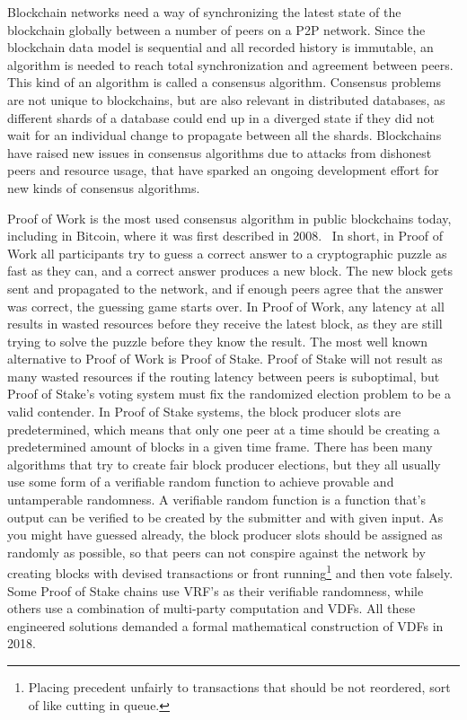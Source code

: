 Blockchain networks need a way of synchronizing the latest state of the blockchain globally between a number of peers on a P2P network. Since the blockchain data model is sequential and all recorded history is immutable, an algorithm is needed to reach total synchronization and agreement between peers. This kind of an algorithm is called a consensus algorithm. Consensus problems are not unique to blockchains, but are also relevant in distributed databases, as different shards of a database could end up in a diverged state if they did not wait for an individual change to propagate between all the shards. Blockchains have raised new issues in consensus algorithms due to attacks from dishonest peers and resource usage, that have sparked an ongoing development effort for new kinds of consensus algorithms.

Proof of Work is the most used consensus algorithm in public blockchains today, including in Bitcoin, where it was first described in 2008.~\cite{Nakamoto2019-ax} In short, in Proof of Work all participants try to guess a correct answer to a cryptographic puzzle as fast as they can, and a correct answer produces a new block. The new block gets sent and propagated to the network, and if enough peers agree that the answer was correct, the guessing game starts over. In Proof of Work, any latency at all results in wasted resources before they receive the latest block, as they are still trying to solve the puzzle before they know the result. The most well known alternative to Proof of Work is Proof of Stake. Proof of Stake will not result as many wasted resources if the routing latency between peers is suboptimal, but Proof of Stake's voting system must fix the randomized election problem to be a valid contender. In Proof of Stake systems, the block producer slots are predetermined, which means that only one peer at a time should be creating a predetermined amount of blocks in a given time frame. There has been many algorithms that try to create fair block producer elections, but they all usually use some form of a verifiable random function to achieve provable and untamperable randomness. A verifiable random function is a function that's output can be verified to be created by the submitter and with given input. As you might have guessed already, the block producer slots should be assigned as randomly as possible, so that peers can not conspire against the network by creating blocks with devised transactions or front running\footnote{Placing precedent unfairly to transactions that should be not reordered, sort of like cutting in queue.} and then vote falsely. Some Proof of Stake chains use VRF's as their verifiable randomness, while others use a combination of multi-party computation and VDFs. All these engineered solutions demanded a formal mathematical construction of VDFs in 2018.

